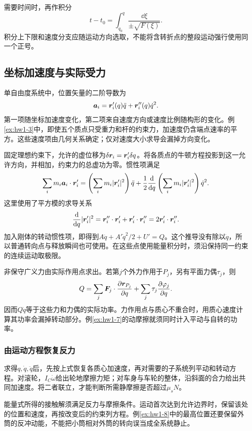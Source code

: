 需要时间时，再作积分
\[
t-t_0=\int_{q_0}^{q}\frac{\dd\xi}{\pm\sqrt{F(\xi)}}.
\]
积分上下限和速度分支应随运动方向选取，不能将含转折点的整段运动强行使用同一个正号。


\subsection{坐标加速度与实际受力}
\label{sec:complete1}
单自由度系统中，位置矢量的二阶导数为
\[
 \bm{a}_i=\bm{r}_i'(q)\ddot q+\bm{r}_i''(q)\dot q^2.
\]
第一项随坐标加速度变化，第二项来自速度方向或速度比例随构形的变化。例\ref{ex:hw1-3}中，即使五个质点只受重力和杆的约束力，加速度仍含端点速率的平方。这些速度项由几何关系确定；仅对速度大小求导会漏掉方向变化。

固定理想约束下，允许的虚位移为$\delta\bm{r}_i=\bm{r}_i'\delta q$。将各质点的牛顿方程投影到这一允许方向，并相加，约束力的总虚功为零。惯性项满足
\[
 \sum_i m_i\bm{a}_i\cdot\bm{r}_i'
 =\left(\sum_i m_i|\bm{r}_i'|^2\right)\ddot q
 +\frac12\frac{\mathop{}\!\mathrm d}{\mathop{}\!\mathrm d q}\left(\sum_i m_i|\bm{r}_i'|^2\right)\dot q^2.
\]
这里使用了平方模的求导关系
\[
\frac{\mathop{}\!\mathrm d}{\mathop{}\!\mathrm d q}|\bm{r}_i'|^2
=\bm{r}_i''\cdot\bm{r}_i'+\bm{r}_i'\cdot\bm{r}_i''
=2\bm{r}_i'\cdot\bm{r}_i''.
\]
加入刚体的转动惯性项，即得到$A\ddot q+A'\dot q^2/2+U'=Q$。这个推导没有除以$\dot q$，所以普通转向点与释放瞬间也可使用。在这些点使用能量积分时，须沿保持同一约束的连续运动取极限。

非保守广义力由实际作用点求出。若第$j$个外力作用于$P_j$，另有平面力偶$\tau_j$，则
\[
 Q=\sum_j\bm{F}_j\cdot\frac{\partial\bm{r}_{P_j}}{\partial q}
   +\sum_j\tau_j\frac{\partial\varphi_j}{\partial q}.
\]
因而$Q\dot q$等于这些力和力偶的实际功率。力作用点与质心不重合时，用质心速度计算其功率会漏掉转动部分。例\ref{ex:hw1-7}的动摩擦就须同时计入平动与自转的功率。

\subsubsection{由运动方程恢复反力}
求得$q,\dot q,\ddot q$后，先按上式恢复各质心加速度，再对需要的子系统列平动和转动方程。对滚轮，$I_C\dot\omega$给出轮地摩擦力矩；对车身与车轮的整体，沿斜面的合力给出共同加速度。将二者联立，才能判断所需静摩擦是否超过$\mu_sN$。

能量式所得的接触解须满足反力与摩擦条件。运动首次达到允许边界时，保留该处的位置和速度，再按改变后的约束列方程。例\ref{ex:hw1-8}中的最高位置还要保留外筒的反冲动能，不能把小筒相对外筒的转向误当成全系统静止。





